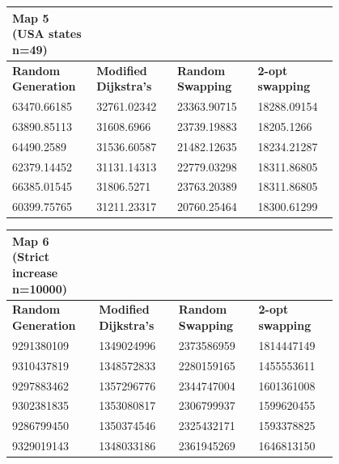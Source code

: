 \documentclass{article}
\begin{document}
\begin{table}[H]
    \centering
    \begin{tabular}{|p{0.2\linewidth}|p{0.2\linewidth}|p{0.2\linewidth}|p{0.2\linewidth}|}
    \hline
        \textbf{Map 5 (USA states n=49)} & ~ & ~ & ~ \\ \hline
        \textbf{Random Generation} & \textbf{Modified Dijkstra's} & \textbf{Random Swapping} & \textbf{2-opt swapping} \\ \hline
        63470.66185 & 32761.02342 & 23363.90715 & 18288.09154 \\ \hline
        63890.85113 & 31608.6966 & 23739.19883 & 18205.1266 \\ \hline
        64490.2589 & 31536.60587 & 21482.12635 & 18234.21287 \\ \hline
        62379.14452 & 31131.14313 & 22779.03298 & 18311.86805 \\ \hline
        66385.01545 & 31806.5271 & 23763.20389 & 18311.86805 \\ \hline
        60399.75765 & 31211.23317 & 20760.25464 & 18300.61299 \\ \hline
     \end{tabular}
\end{table}

\begin{table}[H]
    \centering
    \begin{tabular}{|p{0.2\linewidth}|p{0.2\linewidth}|p{0.2\linewidth}|p{0.2\linewidth}|}
    \hline
        \textbf{Map 6 (Strict increase n=10000)} & ~ & ~ & ~ \\ \hline
        \textbf{Random Generation} & \textbf{Modified Dijkstra's} & \textbf{Random Swapping} & \textbf{2-opt swapping} \\ \hline
        9291380109 & 1349024996 & 2373586959 & 1814447149 \\ \hline
        9310437819 & 1348572833 & 2280159165 & 1455553611 \\ \hline
        9297883462 & 1357296776 & 2344747004 & 1601361008 \\ \hline
        9302381835 & 1353080817 & 2306799937 & 1599620455 \\ \hline
        9286799450 & 1350374546 & 2325432171 & 1593378825 \\ \hline
        9329019143 & 1348033186 & 2361945269 & 1646813150 \\ \hline
    \end{tabular}
\end{table}
\end{document}
